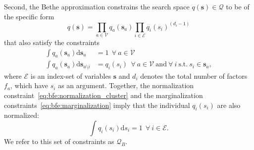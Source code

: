 Second, the Bethe approximation constrains the search space $q(\bm{s}) \in \mathcal{Q}$ to be
of the specific form \begin{equation}
    \label{eq:bfe:factorized_bethe} q(\bm{s}) =
    \prod_{a\in\mathcal{V}} q_a(\bm{s}_a) \prod_{i \in \mathcal{E}} {q_i(s_i)}^{(d_i - 1)}
  \end{equation} that also satisfy the constraints
\begin{subequations}
    \label{eq:bfe:bethe_extra_constraints}
    \begin{align}
        \int q_a(\bm{s}_a) \mathrm{d}\bm{s}_a &=1~~\forall~a\in\mathcal{V} \label{eq:bfe:normalization_cluster} \\
        \int q_{a}(\bm{s}_{a})\mathrm{d}\bm{s}_{a\setminus i} &= q_i(s_i)~~\forall~a \in \mathcal{V}~\mathrm{and}~\forall~i~\mathrm{s.t.}~s_i \in \bm{s}_a, \label{eq:bfe:marginalization}
    \end{align}
\end{subequations}
 where $\mathcal{E}$ is an index-set of variables $\bm{s}$ and $d_i$ denotes the total number of factors $f_a$, which have $s_i$ as an argument.
Together, the normalization constraint~\eqref{eq:bfe:normalization_cluster} and the marginalization constraints~\eqref{eq:bfe:marginalization} imply that the individual $q_i(s_i)$ are also normalized:
\begin{equation}
    \label{eq:bfe:normalization_individual}
    \int q_i(s_i)\mathrm{d}s_i = 1~~\forall~i\in\mathcal{E}.
  \end{equation} 
We refer to this set of constraints as $\mathcal{Q}_B$.

